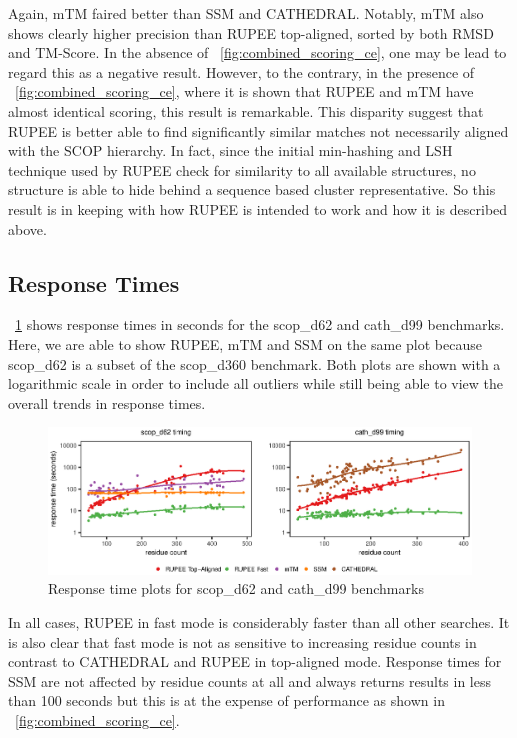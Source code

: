 \documentclass[a4,center,fleqn]{NAR}
\begin{document}
Again, mTM faired better than SSM and CATHEDRAL. 
Notably, mTM also shows clearly higher precision than RUPEE top-aligned, sorted by both RMSD and TM-Score. 
In the absence of \figurename~\ref{fig:combined_scoring_ce}, one may be lead to regard this as a negative result. 
However, to the contrary, in the presence of \figurename~\ref{fig:combined_scoring_ce}, where it is shown that RUPEE and mTM have almost identical scoring, this result is remarkable. 
This disparity suggest that RUPEE is better able to find significantly similar matches not necessarily aligned with the SCOP hierarchy. 
In fact, since the initial min-hashing and LSH technique used by RUPEE check for similarity to all available structures, no structure is able to hide behind a sequence based cluster representative. 
So this result is in keeping with how RUPEE is intended to work and how it is described above. 

\subsection{Response Times}

\figurename~\ref{fig:combined_response} shows response times in seconds for the scop\_d62 and cath\_d99 benchmarks. 
Here, we are able to show RUPEE, mTM and SSM on the same plot because scop\_d62 is a subset of the scop\_d360 benchmark. 
Both plots are shown with a logarithmic scale in order to include all outliers while still being able to view the overall trends in response times. 

\begin{figure}[tb]
\begin{center}
\includegraphics{combined_response}
\end{center}
\caption{Response time plots for scop\_d62 and cath\_d99 benchmarks}
\label{fig:combined_response}
\end{figure}

In all cases, RUPEE in fast mode is considerably faster than all other searches. 
It is also clear that fast mode is not as sensitive to increasing residue counts in contrast to CATHEDRAL and RUPEE in top-aligned mode.
Response times for SSM are not affected by residue counts at all and always returns results in less than 100 seconds but this is at the expense of performance as shown in \figurename~\ref{fig:combined_scoring_ce}.
\end{document}
